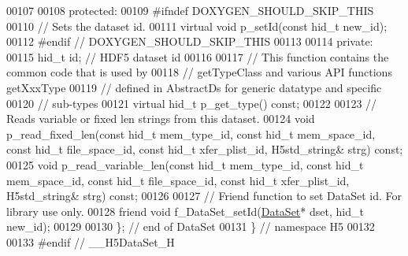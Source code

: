 \begin{DoxyCode}
00107 
00108    \textcolor{keyword}{protected}:
00109 \textcolor{preprocessor}{#ifndef DOXYGEN\_SHOULD\_SKIP\_THIS}
00110         \textcolor{comment}{// Sets the dataset id.}
00111         \textcolor{keyword}{virtual} \textcolor{keywordtype}{void} p\_setId(\textcolor{keyword}{const} hid\_t new\_id);
00112 \textcolor{preprocessor}{#endif // DOXYGEN\_SHOULD\_SKIP\_THIS}
00113 
00114    \textcolor{keyword}{private}:
00115         hid\_t id;       \textcolor{comment}{// HDF5 dataset id}
00116 
00117         \textcolor{comment}{// This function contains the common code that is used by}
00118         \textcolor{comment}{// getTypeClass and various API functions getXxxType}
00119         \textcolor{comment}{// defined in AbstractDs for generic datatype and specific}
00120         \textcolor{comment}{// sub-types}
00121         \textcolor{keyword}{virtual} hid\_t p\_get\_type() \textcolor{keyword}{const};
00122 
00123         \textcolor{comment}{// Reads variable or fixed len strings from this dataset.}
00124         \textcolor{keywordtype}{void} p\_read\_fixed\_len(\textcolor{keyword}{const} hid\_t mem\_type\_id, \textcolor{keyword}{const} hid\_t mem\_space\_id, \textcolor{keyword}{const} hid\_t file\_space\_id,
       \textcolor{keyword}{const} hid\_t xfer\_plist\_id, H5std\_string& strg) \textcolor{keyword}{const};
00125         \textcolor{keywordtype}{void} p\_read\_variable\_len(\textcolor{keyword}{const} hid\_t mem\_type\_id, \textcolor{keyword}{const} hid\_t mem\_space\_id, \textcolor{keyword}{const} hid\_t 
      file\_space\_id, \textcolor{keyword}{const} hid\_t xfer\_plist\_id, H5std\_string& strg) \textcolor{keyword}{const};
00126 
00127         \textcolor{comment}{// Friend function to set DataSet id.  For library use only.}
00128         \textcolor{keyword}{friend} \textcolor{keywordtype}{void} f\_DataSet\_setId(\hyperlink{class_h5_1_1_data_set}{DataSet}* dset, hid\_t new\_id);
00129 
00130 \}; \textcolor{comment}{// end of DataSet}
00131 \} \textcolor{comment}{// namespace H5}
00132 
00133 \textcolor{preprocessor}{#endif // \_\_H5DataSet\_H}
\end{DoxyCode}
